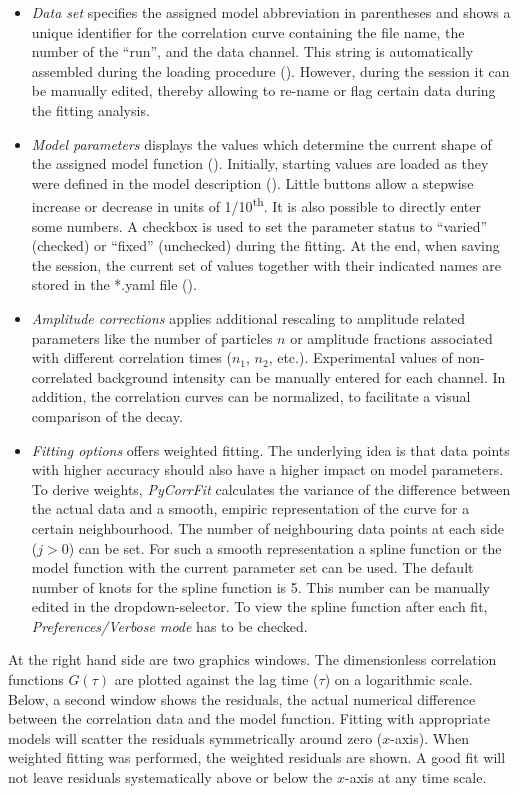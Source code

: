 \begin{itemize}
\item \textit{Data set} specifies the assigned model abbreviation in parentheses and shows a unique identifier for the correlation curve containing the file name, the number of the ``run'', and the data channel. This string is automatically assembled during the loading procedure (). However, during the session it can be manually edited, thereby allowing to re-name or flag certain data during the fitting analysis.
\item \textit{Model parameters} displays the values which determine the current shape of the assigned model function (). Initially, starting values are loaded as they were defined in the model description (). Little buttons allow a stepwise increase or decrease in units of 1/10\textsuperscript{th}. It is also possible to directly enter some numbers. A checkbox is used to set the parameter status to ``varied'' (checked) or ``fixed'' (unchecked) during the fitting. At the end, when saving the session, the current set of values together with their indicated names are stored in the *.yaml file (). 
\item \textit{Amplitude corrections} applies additional rescaling to amplitude related parameters like the number of particles $n$ or amplitude fractions associated with different correlation times ($n_1$, $n_2$, etc.). Experimental values of non-correlated background intensity can be manually entered for each channel. In addition, the correlation curves can be normalized, to facilitate a visual comparison of the decay.
\item \textit{Fitting options} offers weighted fitting. The underlying idea is that data points with higher accuracy should also have a higher impact on model parameters. To derive weights, \textit{PyCorrFit} calculates the variance of the difference between the actual data and a smooth, empiric representation of the curve for a certain neighbourhood. The number of neighbouring data points at each side ($j > 0$) can be set. For such a smooth representation a  spline function or the model function with the current parameter set can be used. The default number of knots for the spline function is 5. This number can be manually edited in the dropdown-selector. To view the spline function after each fit, \textit{Preferences/Verbose mode} has to be checked.
\end{itemize}
At the right hand side are two graphics windows. The dimensionless correlation functions $G(\tau)$ are plotted against the lag time ($\tau$) on a logarithmic scale. Below, a second window shows the residuals, the actual numerical difference between the correlation data and the model function. Fitting with appropriate models will scatter the residuals symmetrically around zero ($x$-axis). When weighted fitting was performed, the weighted residuals are shown. A good fit will not leave residuals systematically above or below the $x$-axis at any time scale.

